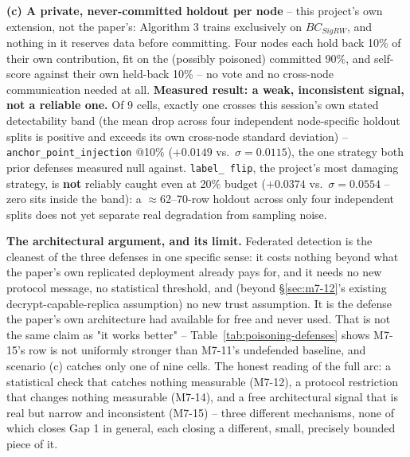 \documentclass[conference]{IEEEtran}
\begin{document}
\textbf{(c) A private, never-committed holdout per node} -- this project's own extension, not the
paper's: Algorithm 3 trains exclusively on $BC_{SigRW}$, and nothing in it reserves data before
committing. Four nodes each hold back 10\% of their own contribution, fit on the (possibly
poisoned) committed 90\%, and self-score against their own held-back 10\% -- no vote and no
cross-node communication needed at all. \textbf{Measured result: a weak, inconsistent signal, not
a reliable one.} Of 9 cells, exactly one crosses this session's own stated detectability band
(the mean drop across four independent node-specific holdout splits is positive and exceeds its
own cross-node standard deviation) -- \texttt{anchor\_point\_injection} @10\% ($+0.0149$ vs.\
$\sigma{=}0.0115$), the one strategy both prior defenses measured null against. \texttt{label\_
flip}, the project's most damaging strategy, is \textbf{not} reliably caught even at 20\% budget
($+0.0374$ vs.\ $\sigma{=}0.0554$ -- zero sits inside the band): a $\approx$62--70-row holdout
across only four independent splits does not yet separate real degradation from sampling noise.

\begin{table}[t]
\centering
\caption{The poisoning-defense arc's capstone: all four sessions' own headline numbers at the
10\% budget. M7-15's row is scenario (b)'s majority vote -- the one scenario needing no
assumption about who trains on what.}
\label{tab:poisoning-defenses}
\footnotesize
{}
\end{table}

\textbf{The architectural argument, and its limit.} Federated detection is the cleanest of the
three defenses in one specific sense: it costs nothing beyond what the paper's own replicated
deployment already pays for, and it needs no new protocol message, no statistical threshold, and
(beyond \S\ref{sec:m7-12}'s existing decrypt-capable-replica assumption) no new trust assumption.
It is the defense the paper's own architecture had available for free and never used. That is not
the same claim as "it works better" -- Table~\ref{tab:poisoning-defenses} shows M7-15's row is not
uniformly stronger than M7-11's undefended baseline, and scenario (c) catches only one of nine
cells. The honest reading of the full arc: a statistical check that catches nothing measurable
(M7-12), a protocol restriction that changes nothing measurable (M7-14), and a free architectural
signal that is real but narrow and inconsistent (M7-15) -- three different mechanisms, none of
which closes Gap 1 in general, each closing a different, small, precisely bounded piece of it.
\end{document}

